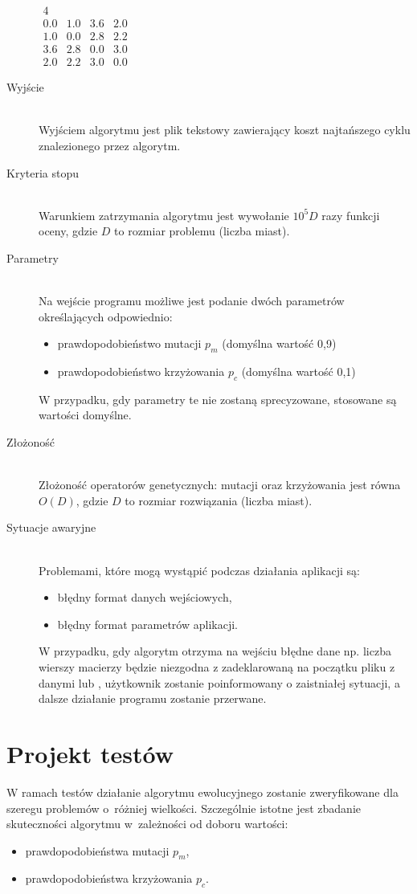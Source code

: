 \documentclass[12pt, a4paper]{article}
\begin{document}
\begin{description}
\bigskip
$ 
\begin{array}{llll}
4 \\
0.0 & 1.0 & 3.6 & 2.0 \\
1.0 & 0.0 & 2.8 & 2.2 \\
3.6 & 2.8 & 0.0 & 3.0 \\
2.0 & 2.2 & 3.0 & 0.0
\end{array}
$
	\item[Wyjście] \hfill \\
	Wyjściem algorytmu jest plik tekstowy zawierający koszt najtańszego cyklu znalezionego przez algorytm.
	\item[Kryteria stopu] \hfill \\
	Warunkiem zatrzymania algorytmu jest wywołanie $10^5D$ razy funkcji oceny, gdzie $D$ to rozmiar problemu (liczba miast).
	\item[Parametry] \hfill \\
	Na wejście programu możliwe jest podanie dwóch parametrów określających odpowiednio:
		\begin{itemize}
			\item prawdopodobieństwo mutacji $p_m$ (domyślna wartość 0,9)
			\item prawdopodobieństwo krzyżowania $p_c$ (domyślna wartość 0,1)
		\end{itemize}
		W przypadku, gdy parametry te nie zostaną sprecyzowane, stosowane są wartości domyślne.
	\item[Złożoność] \hfill \\
	Złożoność operatorów genetycznych: mutacji oraz krzyżowania jest równa $O(D)$, gdzie $D$ to rozmiar rozwiązania (liczba miast).
	\item[Sytuacje awaryjne] \hfill \\
Problemami, które mogą wystąpić podczas działania aplikacji są:
	\begin{itemize}
        \item błędny format danych wejściowych,
        \item błędny format parametrów aplikacji.
	\end{itemize}

W przypadku, gdy algorytm otrzyma na wejściu błędne dane np. liczba wierszy macierzy będzie niezgodna z zadeklarowaną na początku pliku z danymi lub , użytkownik zostanie poinformowany o zaistniałej sytuacji, a dalsze działanie programu zostanie przerwane.

\end{description}

\section{Projekt testów}
W ramach testów działanie algorytmu ewolucyjnego zostanie zweryfikowane dla szeregu problemów o~różniej wielkości. Szczególnie istotne jest zbadanie skuteczności algorytmu w~zależności od doboru wartości:
\begin{itemize}
	\item prawdopodobieństwa mutacji $p_m$,
	\item prawdopodobieństwa krzyżowania $p_c$.
\end{itemize}
\end{document}
